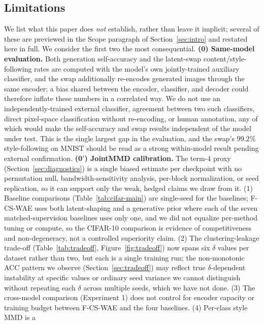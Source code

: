 \documentclass[10pt,letterpaper]{article}
\newcommand{\ours}{F-CS-WAE}
\begin{document}
\subsection{Limitations}
\label{sec:limitations}

We list what this paper does \emph{not} establish, rather than leave it
implicit; several of these are previewed in the Scope paragraph of
Section~\ref{sec:intro} and restated here in full. We consider the first two
the most consequential. \textbf{(0) Same-model evaluation.} Both generation
self-accuracy and the latent-swap content/style-following rates are computed
with the model's own jointly-trained auxiliary classifier, and the swap
additionally re-encodes generated images through the same encoder; a bias
shared between the encoder, classifier, and decoder could therefore inflate
these numbers in a correlated way. We do not use an independently-trained
external classifier, agreement between two such classifiers, direct
pixel-space classification without re-encoding, or human annotation, any of
which would make the self-accuracy and swap results independent of the model
under test. This is the single largest gap in the evaluation, and the swap's
$99.2\%$ style-following on MNIST should be read as a strong within-model
result pending external confirmation. \textbf{(0$'$) JointMMD calibration.}
The term-4 proxy (Section~\ref{sec:diagnostics}) is a single biased estimate
per checkpoint with no permutation null, bandwidth-sensitivity analysis,
per-block normalization, or seed replication, so it can support only the
weak, hedged claims we draw from it. (1) Baseline comparisons
(Table~\ref{tab:cifar-main}) are single-seed for the baselines; \ours{} uses
both latent-shaping and a generative prior where each of the seven
matched-supervision baselines uses only one, and we did not equalize
per-method tuning or compute, so the CIFAR-10 comparison is evidence of
competitiveness and non-degeneracy, not a controlled superiority claim.
(2) The clustering-leakage trade-off
(Table~\ref{tab:tradeoff}, Figure~\ref{fig:tradeoff}) now spans six $\delta$
values per dataset rather than two, but each is a single training run; the
non-monotonic ACC pattern we observe (Section~\ref{sec:tradeoff}) may
reflect true $\delta$-dependent instability at specific values or ordinary
seed variance we cannot distinguish without repeating each $\delta$ across
multiple seeds, which we have not done. (3) The cross-model
comparison (Experiment 1) does not control for encoder capacity or training
budget between \ours{} and the four baselines. (4) Per-class style MMD is a
\end{document}
